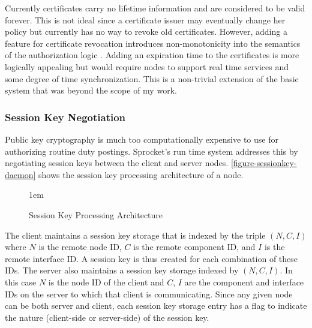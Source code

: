 Currently certificates carry no lifetime information and are considered to be valid forever.
This is not ideal since a certificate issuer may eventually change her policy but currently has
no way to revoke old certificates. However, adding a feature for certificate revocation
introduces non-monotonicity into the semantics of the authorization logic
\cite{Li01nonmonotonicity,Rivest:1998:WEC:647502.728327}. Adding an expiration time to the
certificates is more logically appealing but would require nodes to support real time services
and some degree of time synchronization. This is a non-trivial extension of the basic system
that was beyond the scope of my work.

\subsubsection{Session Key Negotiation}

Public key cryptography is much too computationally expensive to use for authorizing routine
duty postings. Sprocket's run time system addresses this by negotiating session keys between the
client and server nodes. \autoref{figure-sessionkey-daemon} shows the session key processing
architecture of a node.

\begin{figure}[htbp]
  
  \centerline{\raise 1em\box\graph}
  \caption{Session Key Processing Architecture}
  \label{figure-sessionkey-daemon}
\end{figure}

The client maintains a session key storage that is indexed by the triple $(N, C, I)$ where $N$
is the remote node ID, $C$ is the remote component ID, and $I$ is the remote interface ID. A
session key is thus created for each combination of these IDs. The server also maintains a
session key storage indexed by $(N, C, I)$. In this case $N$ is the node ID of the client and
$C$, $I$ are the component and interface IDs on the server to which that client is
communicating. Since any given node can be both server and client, each session key storage
entry has a flag to indicate the nature (client-side or server-side) of the session key.

%

